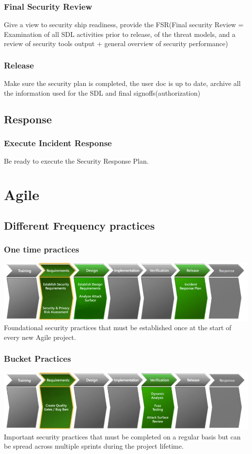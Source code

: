 \documentclass[10pt,a4paper,final]{report}
\begin{document}
\subsubsection{Final Security Review}
Give a view to security ship readiness, provide the FSR(Final security Review = Examination of all SDL activities prior to release, of the threat models, and a review of security tools output + general overview of security performance)
\subsubsection{Release}
Make sure the security plan is completed, the user doc is up to date, archive all the information used for the SDL and final signoffs(authorization)
\subsection{Response}
\subsubsection{Execute Incident Response}
Be ready to execute the Security Response Plan.
\section{Agile}
\subsection{Different Frequency practices}
\subsubsection{One time practices}
\includegraphics[scale=.53]{oneTime.jpg}\\
Foundational security practices that must be  established once at the start of every new  Agile project.
\subsubsection{Bucket Practices}
\includegraphics[scale=.55]{bucket.jpg}\\
Important security practices that must be  completed on a regular basis but can be  spread across multiple sprints during the  project lifetime.
\end{document}
